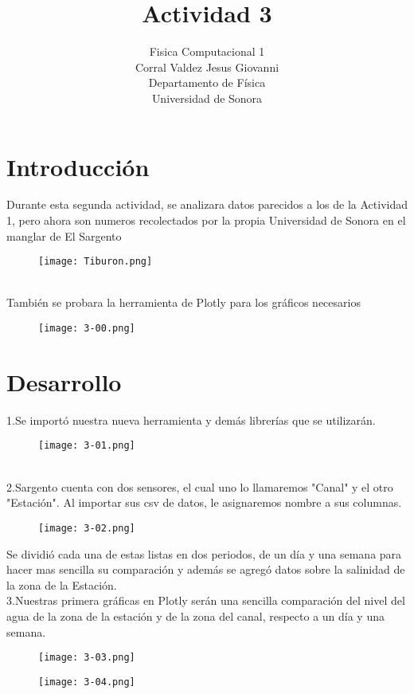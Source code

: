\documentclass{article}
\title{Actividad 3}
\author{Fisica Computacional 1\\
Corral Valdez Jesus Giovanni\\
Departamento de Física\\
Universidad de Sonora}
\date{}
\begin{document}
\maketitle
\clearpage
\section{Introducción}
Durante esta segunda actividad, se analizara datos parecidos a los de la Actividad 1, pero ahora son numeros recolectados por la propia Universidad de Sonora en el manglar de El Sargento\\
\begin{figure}[h]
  \texttt{[image: Tiburon.png]}
\end{figure}
\\
También se probara la herramienta de Plotly para los gráficos necesarios\\
\begin{figure}[h]
  \texttt{[image: 3-00.png]}
\end{figure}

\clearpage
\section{Desarrollo}
1.Se importó nuestra nueva herramienta y demás librerías que se utilizarán.\\
\begin{figure}[h]
  \texttt{[image: 3-01.png]}
\end{figure}
\\
2.Sargento cuenta con dos sensores, el cual uno lo llamaremos "Canal" y el otro "Estación". Al importar sus csv de datos, le asignaremos nombre a sus columnas.\\
\begin{figure}[h]
  \texttt{[image: 3-02.png]}
\end{figure}
Se dividió cada una de estas listas en dos periodos, de un día y una semana para hacer mas sencilla su comparación y además se agregó datos sobre la salinidad de la zona de la Estación. \\
\clearpage
3.Nuestras primera gráficas en Plotly serán una sencilla comparación del nivel del agua de la zona de la estación y de la zona del canal, respecto a un día y una semana.\\
\begin{figure}[h]
  \texttt{[image: 3-03.png]}
\end{figure}
\begin{figure}[h]
  \texttt{[image: 3-04.png]}
\end{figure}
\end{document}
